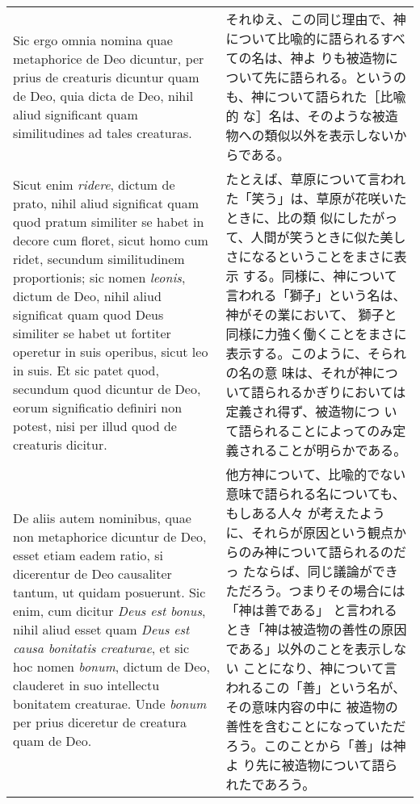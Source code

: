 \documentclass[10pt]{jsarticle} %
\begin{document}
\begin{longtable}{p{21em}p{21em}}
\\


Sic ergo omnia nomina quae metaphorice de Deo dicuntur, per prius de
creaturis dicuntur quam de Deo, quia dicta de Deo, nihil aliud
significant quam similitudines ad tales creaturas.

&

それゆえ、この同じ理由で、神について比喩的に語られるすべての名は、神よ
りも被造物について先に語られる。というのも、神について語られた［比喩的
な］名は、そのような被造物への類似以外を表示しないからである。

\\


Sicut enim {\itshape ridere}, dictum de prato, nihil aliud significat
quam quod pratum similiter se habet in decore cum floret, sicut homo
cum ridet, secundum similitudinem proportionis; sic nomen {\itshape
leonis}, dictum de Deo, nihil aliud significat quam quod Deus
similiter se habet ut fortiter operetur in suis operibus, sicut leo in
suis. Et sic patet quod, secundum quod dicuntur de Deo, eorum
significatio definiri non potest, nisi per illud quod de creaturis
dicitur.

&

たとえば、草原について言われた「笑う」は、草原が花咲いたときに、比の類
似にしたがって、人間が笑うときに似た美しさになるということをまさに表示
する。同様に、神について言われる「獅子」という名は、神がその業において、
獅子と同様に力強く働くことをまさに表示する。このように、そられの名の意
味は、それが神について語られるかぎりにおいては定義され得ず、被造物につ
いて語られることによってのみ定義されることが明らかである。



\\




De aliis autem nominibus, quae non metaphorice dicuntur de Deo, esset
etiam eadem ratio, si dicerentur de Deo causaliter tantum, ut quidam
posuerunt. Sic enim, cum dicitur {\itshape Deus est bonus}, nihil
aliud esset quam {\itshape Deus est causa bonitatis creaturae}, et sic
hoc nomen {\itshape bonum}, dictum de Deo, clauderet in suo intellectu
bonitatem creaturae. Unde {\itshape bonum} per prius diceretur de
creatura quam de Deo.


&

他方神について、比喩的でない意味で語られる名についても、もしある人々
が考えたように、それらが原因という観点からのみ神について語られるのだっ
たならば、同じ議論ができただろう。つまりその場合には「神は善である」
と言われるとき「神は被造物の善性の原因である」以外のことを表示しない
ことになり、神について言われるこの「善」という名が、その意味内容の中に
被造物の善性を含むことになっていただろう。このことから「善」は神よ
り先に被造物について語られたであろう。


\end{longtable}
\end{document}
